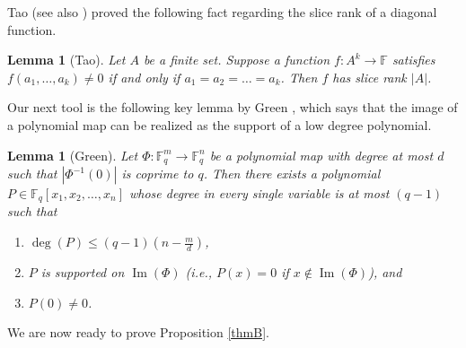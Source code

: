 \documentclass[11pt]{amsart}
\DeclareMathOperator{\Ima}{Im}
\newcommand{\F}{\mathbb{F}}
\newcommand{\ifff}{if and only if }
\newcommand\Fq{{\mathbb{F}_q}}
\newtheorem{lemma}[theorem]{Lemma}
\theoremstyle{definition}
\theoremstyle{remark}
\newtheorem{example}{Example}
\begin{document}
	

Tao \cite[Lemma 1]{tao} (see also \cite[Lemma 6.5.5]{zhao}) proved the following fact regarding the slice rank of a diagonal function.
\begin{lemma}[Tao] \label{srdiag}
Let $A$ be a finite set.
	Suppose a function $f:A^k\rightarrow \F$ satisfies $f(a_1,\dots, a_k)\neq 0$ \ifff $a_1=a_2=\dots=a_k$. Then $f$ has slice rank $|A|$. 
\end{lemma}

Our next tool is the following key lemma by Green \cite[Lemma 3.1]{green}, which says that the image of a polynomial map can be realized as the support of a low degree polynomial.
\begin{lemma}[Green]\label{greenlemma}
	Let $\Phi:\mathbb{F}_q^m \rightarrow \mathbb{F}_q^{n}$ be a polynomial map with degree at most $d$ such that $|\Phi^{-1}(0)|$ is coprime to $q$. Then there exists a polynomial $P\in \Fq[x_1,x_2,\dots,x_{n}]$ whose degree in every single variable is at most $(q-1)$ such that 
	\begin{enumerate}[label=(\roman*)]
		\item  $\deg(P) \leq (q-1) \left(n-\frac{m}{d}\right)$,
		\item $P$ is supported on $\Ima(\Phi)$ (i.e., $P(x)=0$ if $x\notin \Ima(\Phi)$), and
		\item $P(0)\neq 0$.
	\end{enumerate}
	
\end{lemma}


We are now ready to prove Proposition \ref{thmB}.
\end{document}

